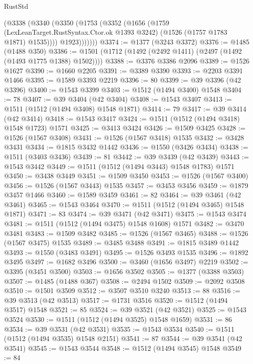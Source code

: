 \begin{lexlean}{RustStd}
\begin{coremodule}
{\begin{coremodule}
{{{{{{{{{{{{{{{{{{{{{{{{{{{{{{{{{{{          (@3338
            (@3340
              (@3350
                (@1753
                  (@3352
                    (@1656
                      (@1759
                        (LexLeanTarget.RustSyntax.Ctor.ok @1393 @3242)
                        (@1526 (@1757 @1783 @1871) @1535))))
                  @1923)))))))
@3374 := @1377 (@3243 @3372)
@3376 := @1485 (@1488 @350)
@3386 := @1501 (@1712 (@1492 (@2492 @1411) (@2497 (@1492 (@1493 @1775 @1388) @1502))))
@3388 := @3376 @3386 @2096
@3389 := @1526 @1627
@3390 := @1660 @2205
@3391 := @3389 @3390
@3393 := @2203 @3391 @1466
@3395 := @1589 @3393 @2219
@3396 := 80
@3399 := @39 @3396 (@42 @3396)
@3400 := @1543 @3399
@3403 := @1512 (@1494 @3400) @1548
@3404 := 78
@3407 := @39 @3404 (@42 @3404)
@3408 := @1543 @3407
@3413 := @1511 (@1512 (@1494 @3408) @1548 @1871)
@3414 := 79
@3417 := @39 @3414 (@42 @3414)
@3418 := @1543 @3417
@3424 := @1511 (@1512 (@1494 @3418) @1548 @1723) @1571
@3425 := @3413 @3424
@3426 := @1509 @3425
@3428 := @1526 (@1567 @3408)
@3431 := @1526 (@1567 @3418) @1535
@3432 := @3428 @3431
@3434 := @1815 @3432 @1442
@3436 := @1550 (@3426 @3434)
@3438 := @1511 (@3403 @3436)
@3439 := 81
@3442 := @39 @3439 (@42 @3439)
@3443 := @1543 @3442
@3449 := @1511 (@1512 (@1494 @3443) @1548 @1783) @1571
@3450 := @3438 @3449
@3451 := @1509 @3450
@3453 := @1526 (@1567 @3400)
@3456 := @1526 (@1567 @3443) @1535
@3457 := @3453 @3456
@3459 := @1879 @3457 @1466
@3460 := @1589 @3459
@3461 := 82
@3464 := @39 @3461 (@42 @3461)
@3465 := @1543 @3464
@3470 := @1511 (@1512 (@1494 @3465) @1548 @1871)
@3471 := 83
@3474 := @39 @3471 (@42 @3471)
@3475 := @1543 @3474
@3481 := @1511 (@1512 (@1494 @3475) @1548 @1608) @1571
@3482 := @3470 @3481
@3483 := @1509 @3482
@3485 := @1526 (@1567 @3465)
@3488 := @1526 (@1567 @3475) @1535
@3489 := @3485 @3488
@3491 := @1815 @3489 @1442
@3493 := @1550 (@3483 @3491)
@3495 := @1526 @3493 @1535
@3496 := @1892 @3495
@3497 := @1682 @3496
@3500 := @3460 (@1656 @3497) @2219
@3502 := @3395 (@3451 @3500)
@3503 := @1656 @3502
@3505 := @1377 (@3388 @3503)
@3507 := @1485 (@1488 @367)
@3508 := @2494 @1502
@3509 := @2092 @3508
@3510 := @1501 @3509
@3512 := @3507 @3510 @3240
@3513 := 88
@3516 := @39 @3513 (@42 @3513)
@3517 := @1731 @3516
@3520 := @1512 (@1494 @3517) @1548
@3521 := 85
@3524 := @39 @3521 (@42 @3521)
@3525 := @1543 @3524
@3530 := @1511 (@1512 (@1494 @3525) @1548 @1659)
@3531 := 86
@3534 := @39 @3531 (@42 @3531)
@3535 := @1543 @3534
@3540 := @1511 (@1512 (@1494 @3535) @1548 @2151)
@3541 := 87
@3544 := @39 @3541 (@42 @3541)
@3545 := @1543 @3544
@3548 := @1512 (@1494 @3545) @1548
@3549 := 84
}}}}}}}}}}}}}}}}}}}}}}}}}}}}}}}}}}}
\end{coremodule}}
\end{coremodule}
\end{lexlean}
